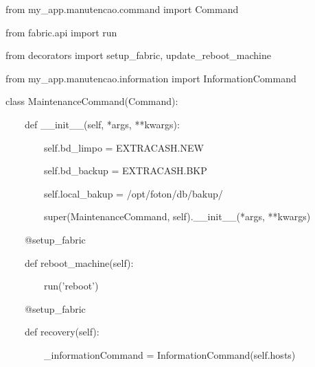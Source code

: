 {\ttfamily\color[rgb]{0.10980392,0.10980392,0.10980392}
    from my\_app.manutencao.command import Command}

{\ttfamily\color[rgb]{0.10980392,0.10980392,0.10980392}
    from fabric.api import run}

{\ttfamily\color[rgb]{0.10980392,0.10980392,0.10980392}
    from decorators import setup\_fabric, update\_reboot\_machine}

{\ttfamily\color[rgb]{0.10980392,0.10980392,0.10980392}
    from my\_app.manutencao.information import InformationCommand}


    \bigskip


    \bigskip

{\ttfamily\color[rgb]{0.10980392,0.10980392,0.10980392}
    class MaintenanceCommand(Command):}


    \bigskip

{\ttfamily\color[rgb]{0.10980392,0.10980392,0.10980392}
    \ \ \ \ def \_\_init\_\_(self, *args, **kwargs):}

{\ttfamily\color[rgb]{0.10980392,0.10980392,0.10980392}
    \ \ \ \ \ \ \ \ self.bd\_limpo = {\textquotedbl}EXTRACASH.NEW{\textquotedbl}}

{\ttfamily\color[rgb]{0.10980392,0.10980392,0.10980392}
    \ \ \ \ \ \ \ \ self.bd\_backup = {\textquotedbl}EXTRACASH.BKP{\textquotedbl}}

{\ttfamily\color[rgb]{0.10980392,0.10980392,0.10980392}
    \ \ \ \ \ \ \ \ self.local\_bakup = {\textquotedbl}/opt/foton/db/bakup/{\textquotedbl}}

{\ttfamily\color[rgb]{0.10980392,0.10980392,0.10980392}
    \ \ \ \ \ \ \ \ super(MaintenanceCommand, self).\_\_init\_\_(*args, **kwargs)}


    \bigskip

{\ttfamily\color[rgb]{0.10980392,0.10980392,0.10980392}
    \ \ \ \ @setup\_fabric}

{\ttfamily\color[rgb]{0.10980392,0.10980392,0.10980392}
    \ \ \ \ def reboot\_machine(self):}

{\ttfamily\color[rgb]{0.10980392,0.10980392,0.10980392}
    \ \ \ \ \ \ \ \ run('reboot')}


    \bigskip

{\ttfamily\color[rgb]{0.10980392,0.10980392,0.10980392}
    \ \ \ \ @setup\_fabric}

{\ttfamily\color[rgb]{0.10980392,0.10980392,0.10980392}
    \ \ \ \ def recovery(self):}

{\ttfamily\color[rgb]{0.10980392,0.10980392,0.10980392}
    \ \ \ \ \ \ \ \ \_informationCommand = InformationCommand(self.hosts)}

